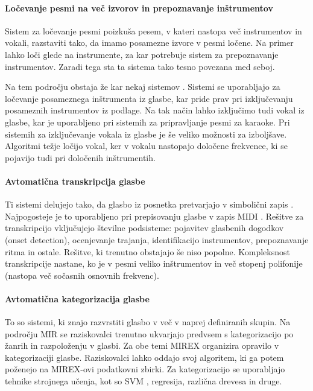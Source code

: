 \documentclass[a4paper, 12pt]{book}
\begin{document}
{\paragraph{Ločevanje pesmi na več izvorov in prepoznavanje inštrumentov}

Sistem za ločevanje pesmi poizkuša pesem, v kateri nastopa več instrumentov in vokali, razstaviti tako, da imamo posamezne izvore v pesmi ločene. Na primer lahko loči glede na instrumente, za kar potrebuje sistem za prepoznavanje instrumentov. Zaradi tega sta ta sistema tako tesno povezana med seboj. 

Na tem področju obstaja že kar nekaj sistemov \cite{Gillet2008,  Li2007}. Sistemi se uporabljajo za ločevanje posameznega inštrumenta iz glasbe, kar pride prav pri izključevanju posameznih instrumentov iz podlage. Na tak način lahko izključimo tudi vokal iz glasbe, kar je uporabljeno pri sistemih za pripravljanje pesmi za karaoke. Pri sistemih za izključevanje vokala iz glasbe je še veliko možnosti za izboljšave. Algoritmi težje ločijo vokal, ker v vokalu nastopajo določene frekvence, ki se pojavijo tudi pri določenih inštrumentih.  

\paragraph{Avtomatična transkripcija glasbe}

Ti sistemi delujejo tako, da glasbo iz posnetka pretvarjajo v simbolični zapis \cite{Gerhard, Klapuri2006, Klapuri2004}. Najpogosteje je to uporabljeno pri prepisovanju glasbe v zapis MIDI \cite{Smith1983}. Rešitve za transkripcijo vključujejo številne podsisteme: pojavitev glasbenih dogodkov (onset detection), ocenjevanje trajanja, identifikacijo instrumentov, prepoznavanje ritma in ostale. Rešitve, ki trenutno obstajajo še niso popolne. Kompleksnost transkripcije nastane, ko je v pesmi veliko inštrumentov in več stopenj polifonije (nastopa več sočasnih osnovnih frekvenc). 

\paragraph{Avtomatična kategorizacija glasbe}

To so sistemi, ki znajo razvrstiti glas\-bo v več v naprej definiranih skupin. Na področju MIR se raziskovalci trenutno ukvarjajo predvsem s kategorizacijo po žanrih in razpoloženju v glasbi. Za obe temi MIREX organizira opravilo v kategorizaciji glasbe. Raziskovalci lahko oddajo svoj algoritem, ki ga potem poženejo na MIREX-ovi podatkovni zbirki. Za kategorizacijo se uporabljajo tehnike strojnega učenja, kot so SVM \cite{ben2010user}, regresija, različna drevesa in druge.

}
\end{document}
